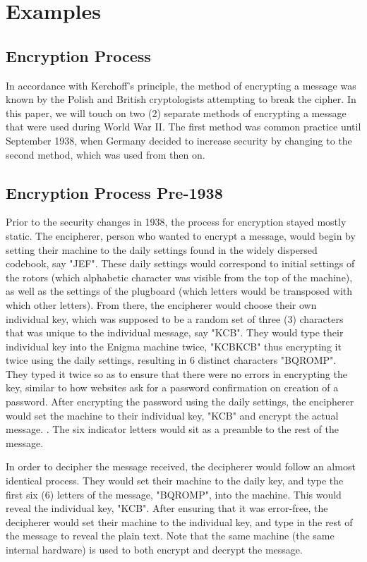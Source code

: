 \chapter{Examples}\label{chap:examples}

\section{Encryption Process}

In accordance with Kerchoff's principle, the method of encrypting a message was known by the Polish and British cryptologists attempting to break the cipher. In this paper, we will touch on two (2) separate methods of encrypting a message that were used during World War II. The first method was common practice until September 1938, when Germany decided to increase security by changing to the second method, which was used from then on.

\section{Encryption Process Pre-1938}\label{sec:encprocess1938}

Prior to the security changes in 1938, the process for encryption stayed mostly static. The encipherer, person who wanted to encrypt a message, would begin by setting their machine to the daily settings found in the widely dispersed codebook, say "JEF". These daily settings would correspond to initial settings of the rotors (which alphabetic character was visible from the top of the machine), as well as the settings of the plugboard (which letters would be transposed with which other letters). From there, the encipherer would choose their own individual key, which was supposed to be a random set of three (3) characters that was unique to the individual message, say "KCB". They would type their individual key into the Enigma machine twice, "KCBKCB" thus encrypting it twice using the daily settings, resulting in 6 distinct characters "BQROMP". They typed it twice so as to ensure that there were no errors in encrypting the key, similar to how websites ask for a password confirmation on creation of a password. After encrypting the password using the daily settings, the encipherer would set the machine to their individual key, "KCB" and encrypt the actual message. \cite{wt06}. The six indicator letters would sit as a preamble to the rest of the message.

In order to decipher the message received, the decipherer would follow an almost identical process. They would set their machine to the daily key, and type the first six (6) letters of the message, "BQROMP", into the machine. This would reveal the individual key, "KCB". After ensuring that it was error-free, the decipherer would set their machine to the individual key, and type in the rest of the message to reveal the plain text. Note that the same machine (the same internal hardware) is used to both encrypt and decrypt the message.

